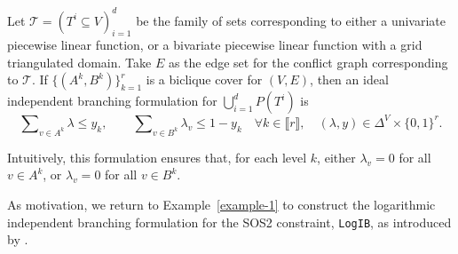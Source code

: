 \documentclass[opre,nonblindrev]{informs3} %
\newcommand{\blue}[1]{{#1}}
\newcommand{\calT}{\mathcal{T}}
\newcommand{\LogIB}{\texttt{LogIB}}
\begin{document}
\begin{proposition}\label{bicliqueprop}
Let $\calT = (T^i \subseteq V)_{i=1}^d$ be the family of sets corresponding to either a univariate piecewise linear function, or a bivariate piecewise linear function with a grid triangulated domain. Take $E$ as the edge set for the conflict graph corresponding to $\calT$. \blue{If $\{(A^k,B^k)\}_{k=1}^r$ is a biclique cover for $(V,E)$,}
then an ideal independent branching formulation
  for $\bigcup_{i=1}^d P(T^i)$ is
  \begin{equation} \label{bicliqueform}
      \sum\nolimits_{v \in A^k} \lambda \leq y_k, \quad\quad \sum\nolimits_{v \in B^k} \lambda_v \leq 1 - y_k \quad \forall k \in \llbracket r \rrbracket,\quad
      (\lambda,y) \in \Delta^V \times \{0,1\}^r.
  \end{equation}
\end{proposition}
Intuitively, this formulation ensures that, for each level $k$, either $\lambda_v = 0$ for all $v \in A^k$, or $\lambda_v = 0$ for all $v \in B^k$.


As motivation, we return to Example~\ref{example-1} to construct the logarithmic independent branching formulation for the SOS2 constraint, \LogIB{}, as introduced by \cite{Vielma:2009a}.
\end{document}
